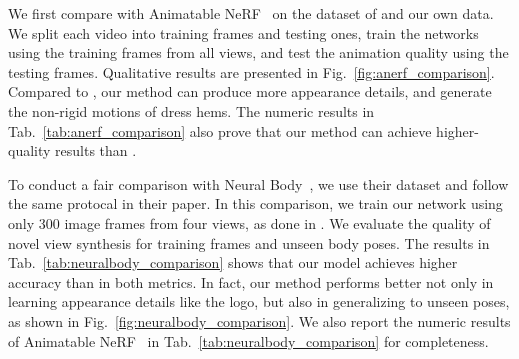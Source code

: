 We first compare with Animatable NeRF~\cite{peng2021animatable_nerf} on the dataset of \cite{habermann2021realtimeDDC} and our own data. 
We split each video into training frames and testing ones, train the networks using the training frames from all views, and test the animation quality using the testing frames. 
Qualitative results are presented in  Fig.~\ref{fig:anerf_comparison}. 
Compared to \cite{peng2021animatable_nerf}, our method can produce more appearance details, and generate the non-rigid motions of dress hems. 
The numeric results in Tab.~\ref{tab:anerf_comparison} also prove that our method can achieve higher-quality results than \cite{peng2021animatable_nerf}. 


To conduct a fair comparison with Neural Body~\cite{peng2021neuralbody}, we use their dataset and follow the same protocal in their paper. In this comparison, we train our network using only 300 image frames from four views, as done in \cite{peng2021neuralbody}. We evaluate the quality of novel view synthesis for training frames and unseen body poses. 
The results in Tab.~\ref{tab:neuralbody_comparison} shows that our model achieves higher accuracy than \cite{peng2021neuralbody} in both metrics. In fact, our method performs better not only in learning appearance details like the logo, but also in generalizing to unseen poses, as shown in Fig.~\ref{fig:neuralbody_comparison}. We also report the numeric results of Animatable NeRF~\cite{peng2021animatable_nerf} in Tab.~\ref{tab:neuralbody_comparison} for completeness. 


